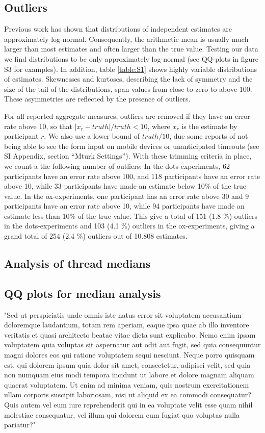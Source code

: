\documentclass[9pt,twoside,lineno]{pnas-new}
\begin{document}
\subsection*{Outliers}
Previous work has shown that distributions of independent estimates are approximately log-normal. Consequently, the arithmetic mean is usually much larger than most estimates and often larger than the true value. Testing our data we find distributions to be only approximately log-normal (see QQ-plots in figure S3 for examples). In addition, table \ref{table:S1} shows highly variable distributions of estimates. Skewnesses and kurtoses, describing the lack of symmetry and the size of the tail of the distributions, span values from close to zero to above 100. These asymmetries are reflected by the presence of outliers. 

For all reported aggregate measures, outliers are removed if they have an error rate above 10, so that $|x_r-truth|/truth <10$, where $x_r$ is the estimate by participant $r$. We also use a lower bound of $truth/10$, due some reports of not being able to see the form input on mobile devices or unanticipated timeouts (see SI Appendix, section “Mturk Settings”). With these trimming criteria in place, we count a the following number of outliers: In the dots-experiments, 62 participants have an error rate above 100, and 118 participants have an error rate above 10, while 33 participants have made an estimate below 10\% of the true value. In the ox-experiments, one participant has an error rate above 30 and 9 participants have an error rate above 10, while 94 participants have made an estimate less than 10\% of the true value. This give a total of 151 (1.8 \%) outliers in the dots-experiments and 103 (4.1 \%) outliers in the ox-experiments, giving a grand total of 254 (2.4 \%) outliers out of 10.808 estimates.



\subsection*{Analysis of thread medians}


\subsection*{QQ plots for median analysis}
"Sed ut perspiciatis unde omnis iste natus error sit voluptatem accusantium doloremque laudantium, totam rem aperiam, eaque ipsa quae ab illo inventore veritatis et quasi architecto beatae vitae dicta sunt explicabo. Nemo enim ipsam voluptatem quia voluptas sit aspernatur aut odit aut fugit, sed quia consequuntur magni dolores eos qui ratione voluptatem sequi nesciunt. Neque porro quisquam est, qui dolorem ipsum quia dolor sit amet, consectetur, adipisci velit, sed quia non numquam eius modi tempora incidunt ut labore et dolore magnam aliquam quaerat voluptatem. Ut enim ad minima veniam, quis nostrum exercitationem ullam corporis suscipit laboriosam, nisi ut aliquid ex ea commodi consequatur? Quis autem vel eum iure reprehenderit qui in ea voluptate velit esse quam nihil molestiae consequatur, vel illum qui dolorem eum fugiat quo voluptas nulla pariatur?"
\end{document}
